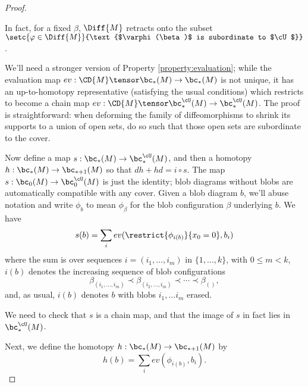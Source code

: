 \begin{proof}
\begin{claim}
In fact, for a fixed $\beta$, $\Diff{M}$ retracts onto the subset $\setc{\varphi \in \Diff{M}}{\text{$\varphi(\beta)$ is subordinate to $\cU$}}$.
\end{claim}

We'll need a stronger version of Property \ref{property:evaluation}; while the evaluation map $ev: \CD{M} \tensor \bc_*(M) \to \bc_*(M)$ is not unique, it has an up-to-homotopy representative (satisfying the usual conditions) which restricts to become a chain map $ev: \CD{M} \tensor \bc^{\cU}_*(M) \to \bc^{\cU}_*(M)$. The proof is straightforward: when deforming the family of diffeomorphisms to shrink its supports to a union of open sets, do so such that those open sets are subordinate to the cover.

Now define a map $s: \bc_*(M) \to \bc^{\cU}_*(M)$, and then a homotopy $h:\bc_*(M) \to \bc_{*+1}(M)$ so that $dh+hd=i\circ s$. The map $s: \bc_0(M) \to \bc^{\cU}_0(M)$ is just the identity; blob diagrams without blobs are automatically compatible with any cover. Given a blob diagram $b$, we'll abuse notation and write $\phi_b$ to mean $\phi_\beta$ for the blob configuration $\beta$ underlying $b$. We have
$$s(b) = \sum_{i} ev(\restrict{\phi_{i(b)}}{x_0 = 0}, b_i)$$
where the sum is over sequences $i=(i_1,\ldots,i_m)$ in $\{1,\ldots,k\}$, with $0\leq m < k$, $i(b)$ denotes the increasing sequence of blob configurations
$$\beta_{(i_1,\ldots,i_m)} \prec \beta_{(i_2,\ldots,i_m)} \prec \cdots \prec \beta_{()},$$
and, as usual, $i(b)$ denotes $b$ with blobs $i_1, \ldots i_m$ erased. 

We need to check that $s$ is a chain map, and that the image of $s$ in fact lies in $\bc^{\cU}_*(M)$. \todo{}

Next, we define the homotopy $h:\bc_*(M) \to \bc_{*+1}(M)$ by
$$h(b) = \sum_{i} ev(\phi_{i(b)}, b_i).$$
\end{proof}
